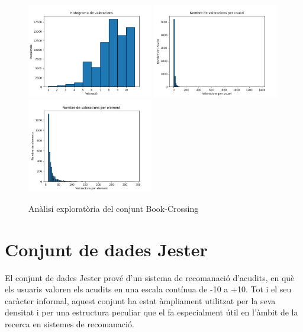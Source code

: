 \documentclass[a4paper,12pt]{report}
\begin{document}
\begin{figure}[H]
    \centering
    \includegraphics[width=0.49\textwidth]{Figuras/books-ratings.png}
    \hfill
    \includegraphics[width=0.49\textwidth]{Figuras/books-users.png}
    \hfill
    \includegraphics[width=0.49\textwidth]{Figuras/books-items.png}
    \caption{Anàlisi exploratòria del conjunt Book-Crossing}
    \label{fig:analisis_books}
\end{figure}

\section{Conjunt de dades Jester}

El conjunt de dades Jester \cite{jesterdataset,goldberg2001eigentaste} prové d’un sistema de recomanació d’acudits, en què els usuaris valoren els acudits en una escala contínua de -10 a +10. Tot i el seu caràcter informal, aquest conjunt ha estat àmpliament utilitzat per la seva densitat i per una estructura peculiar que el fa especialment útil en l’àmbit de la recerca en sistemes de recomanació.
\end{document}
